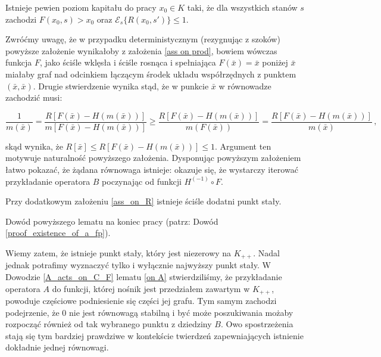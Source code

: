 \begin{ass}\label{ass_on_R2}
	Istnieje pewien poziom kapitału do pracy $ x_0 \in K $ taki, że dla wszystkich stanów $ s $ zachodzi $ F(x_0,s) > x_0 $ oraz $ \mathcal{E}_s \bigl \{ R(x_0,s')	\bigl \} \leq 1  $.
\end{ass}

Zwróćmy uwagę, że w przypadku deterministycznym (rezygnując z szoków) powyższe założenie wynikałoby z założenia \ref{ass on prod}, bowiem wówczas funkcja $ F $, jako ściśle wklęsła i ściśle rosnąca i spełniająca $ F(\bar{x}) = \bar{x} $ poniżej $ \bar{x} $ miałaby graf nad odcinkiem łączącym środek układu współrzędnych z punktem $ (\bar{x}, \bar{x}) $. Drugie stwierdzenie wynika stąd, że w punkcie $ \bar{x} $ w równowadze zachodzić musi:

\begin{equation*}
	\frac{1}{m(\bar{x})} = \frac{R[F(\bar{x})-H(m(\bar{x}))]}{m[F(\bar{x})-H(m(\bar{x}))]} \geq \frac{R[F(\bar{x})-H(m(\bar{x}))]}{m(F(\bar{x}))} = \frac{R[F(\bar{x})-H(m(\bar{x}))]}{m(\bar{x})}\,,
\end{equation*} 

skąd wynika, że $ R[\bar{x}] \leq R[F(\bar{x})-H(m(\bar{x}))] \leq 1 $. Argument ten  motywuje naturalność powyższego założenia. Dysponując powyższym założeniem łatwo pokazać, że żądana równowaga istnieje: okazuje się, że wystarczy iterować przykładanie operatora $ B $ poczynając od funkcji $ H^{(-1)}\circ F $.

\begin{lemat}\label{non-zero_fixed_point}
	Przy dodatkowym założeniu \ref{ass_on_R} istnieje ściśle dodatni punkt stały.
\end{lemat}

Dowód powyższego lematu na koniec pracy (patrz: Dowód \ref{proof_existence_of_a_fp}).

Wiemy zatem, że istnieje punkt stały, który jest niezerowy na $K_{++}$. Nadal jednak potrafimy wyznaczyć tylko i wyłącznie najwyższy punkt stały. W Dowodzie \ref{A_acts_on_C_F} lematu \ref{on A} stwierdziliśmy, że przykładanie operatora $A$ do funkcji, której nośnik jest przedziałem zawartym w $K_{++}$, powoduje częściowe podniesienie się części jej grafu. Tym samym zachodzi podejrzenie, że $0$ nie jest równowagą stabilną i być może poszukiwania możaby rozpocząć również od tak wybranego punktu z dziedziny $B$. Owo spostrzeżenia stają się tym bardziej prawdziwe w kontekście twierdzeń zapewniających istnienie dokładnie jednej równowagi.  


